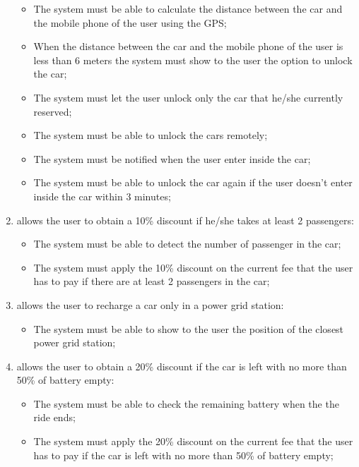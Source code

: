 \begin{enumerate}
\begin{itemize}
\item The system must be able to calculate the distance between the car and the mobile phone of the user using the GPS;
\item When the distance between the car and the mobile phone of the user is less than 6 meters the system must show to the user the option to unlock the car;
\item The system must let the user unlock only the car that he/she currently reserved;
\item The system must be able to unlock the cars remotely;
\item The system must be notified when the user enter inside the car;
\item The system must be able to unlock the car again if the user doesn't enter inside the car within 3 minutes;
\end{itemize}

\item allows the user to obtain a 10\% discount if he/she takes at least 2 passengers:

\begin{itemize}
\item The system must be able to detect the number of passenger in the car;
\item The system must apply the 10\% discount on the current fee that the user has to pay if there are at least 2 passengers in the car;
\end{itemize}

\item allows the user to recharge a car only in a power grid station:

\begin{itemize}
\item The system must be able to show to the user the position of the closest power grid station;
\end{itemize}

\item allows the user to obtain a 20\% discount if the car is left with no more than 50\% of battery empty:

\begin{itemize}
\item The system must be able to check the remaining battery when the the ride ends;
\item The system must apply the 20\% discount on the current fee that the user has to pay if the car is left with no more than 50\% of battery empty;
\end{itemize}


\end{enumerate}
